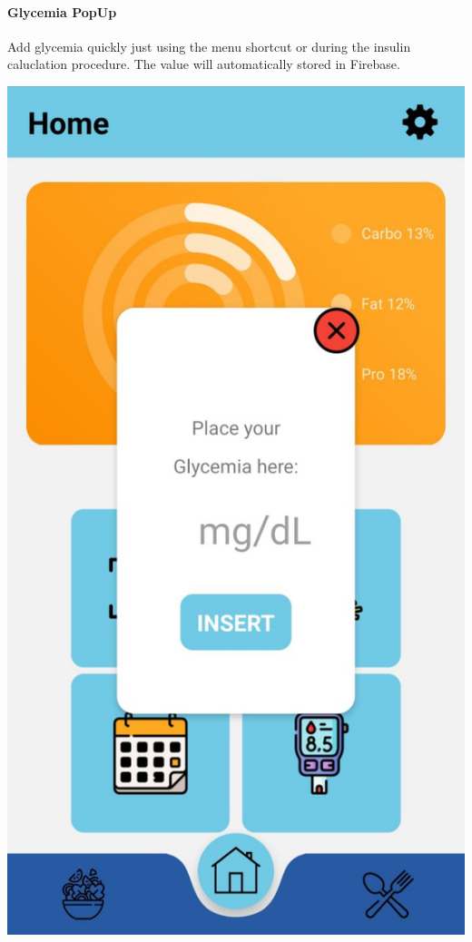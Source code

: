 \documentclass[12pt,hidelinks]{article}
\begin{document}
	\paragraph{Glycemia PopUp}
    Add glycemia quickly just using the menu shortcut or during the insulin caluclation procedure. The value 
	will automatically stored in Firebase.
	\begin{center}

		\includegraphics[scale=0.2]{screenshot1}
	\end{center}
\end{document}
